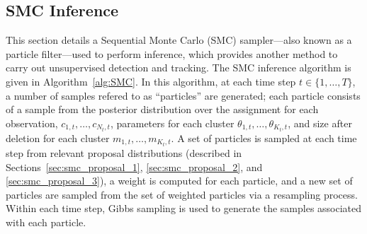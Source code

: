 \documentclass[smallcondensed, final]{svjour3}
\begin{document}






\subsection{SMC Inference}
\label{sec:SMC}

This section details a Sequential Monte Carlo (SMC) sampler---also known as a particle filter---used to perform inference, which provides another method to carry out unsupervised detection and tracking. The SMC inference algorithm is given in Algorithm~\ref{alg:SMC}. In this algorithm, at each time step $t \in \{ 1, \ldots, T \}$, a number of samples refered to as ``particles'' are generated; each particle consists of a sample from the posterior distribution over the assignment for each observation, $c_{1,t}, \ldots, c_{N_{t}, t}$, parameters for each cluster $\theta_{1,t}, \ldots, \theta_{K_{t}, t}$, and size after deletion for each cluster $m_{1,t}, \ldots, m_{K_{t},t}$. A set of particles is sampled at each time step from relevant proposal distributions (described in Sections~\ref{sec:smc_proposal_1}, \ref{sec:smc_proposal_2}, and \ref{sec:smc_proposal_3}), a weight is computed for each particle, and a new set of particles are sampled from the set of weighted particles via a resampling process. Within each time step, Gibbs sampling is used to generate the samples associated with each particle.
\end{document}
